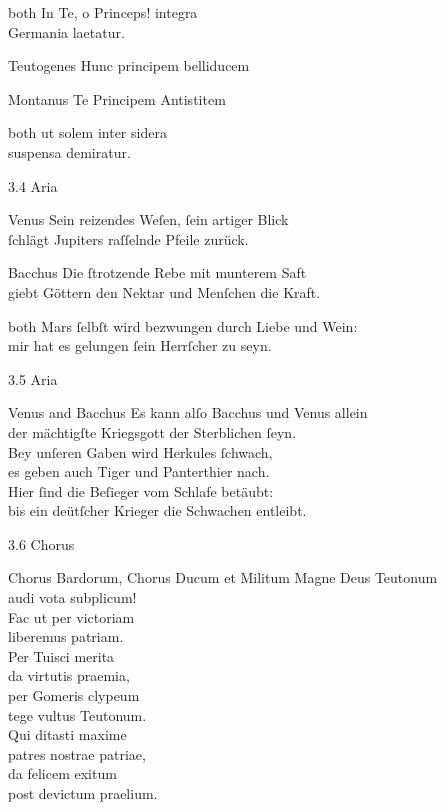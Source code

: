 \documentclass{ees}
\begin{document}
{\begin{lyrics}
  \item[both]
  In Te, o Princeps! integra\\
  Germania laetatur.
  \clearpage
  \item[Teutogenes]
  Hunc principem belliducem

  \item[Montanus]
  Te Principem Antistitem

  \item[both]
  ut solem inter sidera\\
  suspensa demiratur.
\end{lyrics}

3.4 Aria
\begin{lyrics}
  \item[Venus]
  Sein reizendes Weſen, ſein artiger Blick\\
  ſchlägt Jupiters raſſelnde Pfeile zurück.

  \item[Bacchus]
  Die ſtrotzende Rebe mit munterem Saft\\
  giebt Göttern den Nektar und Menſchen die Kraft.

  \item[both]
  Mars ſelbſt wird bezwungen durch Liebe und Wein:\\
  mir hat es gelungen ſein Herrſcher zu seyn.
\end{lyrics}

3.5 Aria
\begin{lyrics}
  \item[Venus and Bacchus]
  Es kann alſo Bacchus und Venus allein\\
  der mächtigſte Kriegsgott der Sterblichen ſeyn.\\
  Bey unſeren Gaben wird Herkules ſchwach,\\
  es geben auch Tiger und Panterthier nach.\\
  Hier ſind die Beſieger vom Schlafe betäubt:\\
  bis ein deütſcher Krieger die Schwachen entleibt.
\end{lyrics}

3.6 Chorus
\begin{lyrics}
  \item[Chorus Bardorum, Chorus Ducum et Militum]
  Magne Deus Teutonum\\
  audi vota subplicum!\\
  Fac ut per victoriam\\
  liberemus patriam.\\[1ex]
  Per Tuisci merita\\
  da virtutis praemia,\\
  per Gomeris clypeum\\
  tege vultus Teutonum.\\[1ex]
  Qui ditasti maxime\\
  patres nostrae patriae,\\
  da felicem exitum\\
  post devictum praelium.
\end{lyrics}
}

\eesScore
\end{document}

